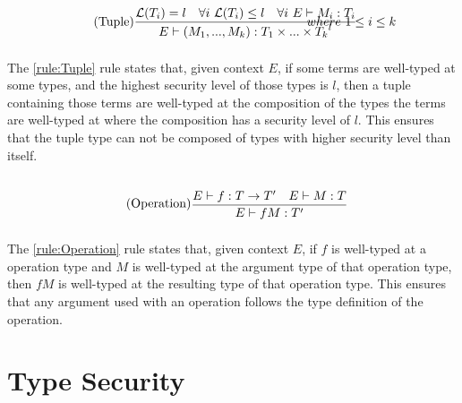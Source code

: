 \begin{align*}
    \tag{Tuple}\label{rule:Tuple} &\infrule{\level{T_i}=l\quad\forall i\ \level{T_i}\leq l\quad\forall i\ E\vdash M_i:T_i}{E\vdash (M_1,...,M_k):{T_1\times...\times T_k}^l}& where\ 1\leq i\leq k
\end{align*}
The \ref{rule:Tuple} rule states that, given context $E$, if some terms are well-typed at some types, and the highest security level of those types is $l$, then a tuple containing those terms are well-typed at the composition of the types the terms are well-typed at where the composition has a security level of $l$.
This ensures that the tuple type can not be composed of types with higher security level than itself.

\begin{align*}
    \tag{Operation}\label{rule:Operation} &\infrule{E\vdash f:T\ra T'\quad E\vdash M:T}{E\vdash fM:T'}
\end{align*}
The \ref{rule:Operation} rule states that, given context $E$, if $f$ is well-typed at a operation type and $M$ is well-typed at the argument type of that operation type, then $fM$ is well-typed at the resulting type of that operation type.
This ensures that any argument used with an operation follows the type definition of the operation.


\section{Type Security}

